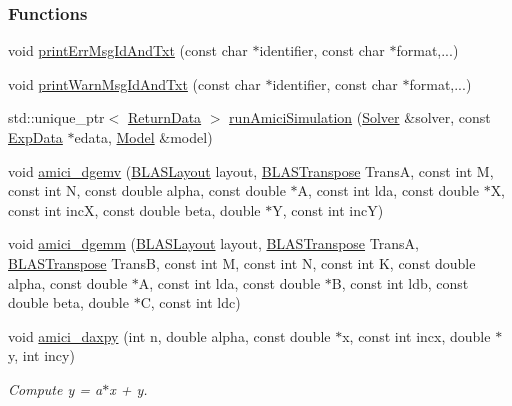 \subsubsection*{Functions}
\begin{DoxyCompactItemize}
\item 
void \mbox{\hyperlink{namespaceamici_ade28c6a7f1b5aee40bb2453fb61b4024}{print\+Err\+Msg\+Id\+And\+Txt}} (const char $\ast$identifier, const char $\ast$format,...)
\item 
void \mbox{\hyperlink{namespaceamici_a14122f73594a970df27bfcb8fa0db35d}{print\+Warn\+Msg\+Id\+And\+Txt}} (const char $\ast$identifier, const char $\ast$format,...)
\item 
std\+::unique\+\_\+ptr$<$ \mbox{\hyperlink{classamici_1_1_return_data}{Return\+Data}} $>$ \mbox{\hyperlink{namespaceamici_a46331a204e7511587acc2cc0b1ce7ed0}{run\+Amici\+Simulation}} (\mbox{\hyperlink{classamici_1_1_solver}{Solver}} \&solver, const \mbox{\hyperlink{classamici_1_1_exp_data}{Exp\+Data}} $\ast$edata, \mbox{\hyperlink{classamici_1_1_model}{Model}} \&model)
\item 
void \mbox{\hyperlink{namespaceamici_aaadff5ccb22e546f3590e15f5ee30c1c}{amici\+\_\+dgemv}} (\mbox{\hyperlink{namespaceamici_a3ec6460bb4e7f6100a15d18627a3ff3e}{B\+L\+A\+S\+Layout}} layout, \mbox{\hyperlink{namespaceamici_a0f0ec77c6c8f48d9c5cb50d54899afae}{B\+L\+A\+S\+Transpose}} TransA, const int M, const int N, const double alpha, const double $\ast$A, const int lda, const double $\ast$X, const int incX, const double beta, double $\ast$Y, const int incY)
\item 
void \mbox{\hyperlink{namespaceamici_a235c0cbd2185cc7351ea9c126e498bd9}{amici\+\_\+dgemm}} (\mbox{\hyperlink{namespaceamici_a3ec6460bb4e7f6100a15d18627a3ff3e}{B\+L\+A\+S\+Layout}} layout, \mbox{\hyperlink{namespaceamici_a0f0ec77c6c8f48d9c5cb50d54899afae}{B\+L\+A\+S\+Transpose}} TransA, \mbox{\hyperlink{namespaceamici_a0f0ec77c6c8f48d9c5cb50d54899afae}{B\+L\+A\+S\+Transpose}} TransB, const int M, const int N, const int K, const double alpha, const double $\ast$A, const int lda, const double $\ast$B, const int ldb, const double beta, double $\ast$C, const int ldc)
\item 
void \mbox{\hyperlink{namespaceamici_ad4c586891a96a47c0a73f8585d6aabcf}{amici\+\_\+daxpy}} (int n, double alpha, const double $\ast$x, const int incx, double $\ast$y, int incy)
\begin{DoxyCompactList}\small\item\em Compute y = a$\ast$x + y. \end{DoxyCompactList}\item 

\end{DoxyCompactItemize}
